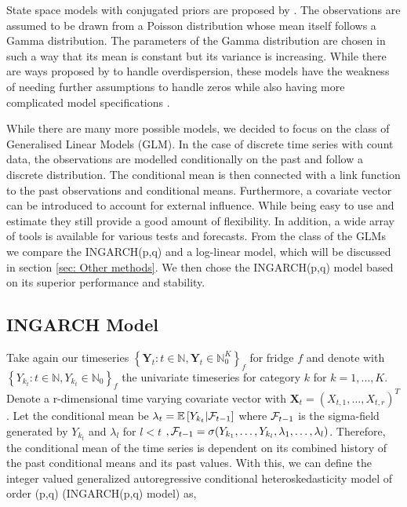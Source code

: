 State space models with conjugated priors are proposed by \cite{Harvey:1989}. The observations are assumed to be drawn from a Poisson distribution whose mean itself follows a Gamma distribution. The parameters of the Gamma distribution are chosen in such a way that its mean is constant but its variance is increasing. While there are ways proposed by \cite{Qaqish:1988} to handle overdispersion, these models have the weakness of needing further assumptions to handle zeros while also having more complicated model specifications \cite{Heinen:2003}.

While there are many more possible models, we decided to focus on the class of Generalised Linear Models (GLM). In the case of discrete time series with count data, the observations are modelled conditionally on the past and follow a discrete distribution. The conditional mean is then connected with a link function to the past observations and conditional means. Furthermore, a covariate vector can be introduced to account for external influence. While being easy to use and estimate they still provide a good amount of flexibility. In addition, a wide array of tools is available for various tests and forecasts. From the class of the GLMs we compare the INGARCH(p,q) and a log-linear model, which will be discussed in section \ref{sec: Other methods}. We then chose the INGARCH(p,q) model based on its superior performance and stability.


\subsection{INGARCH Model}
\label{sec:Ingarch Model}
Take again our timeseries $\left\{\bm{Y}_t:t\in \mathbb{N}, \bm{Y}_t \in \mathbb{N}_0^K \right\}_f$ for fridge $f$ and denote with $\left\{Y_{k_t}:t\in \mathbb{N}, Y_{k_t} \in \mathbb{N}_0\right\}_f$ the univariate timeseries for category $k$ for $k=1,\ldots,K$. Denote a r-dimensional time varying covariate vector with $\textbf{X}_t=(X_{t,1},\ldots,X_{t,r})^T$. Let the conditional mean be $\lambda_t = \mathbb{E}\left[Y_{k_t} | \mathcal{F}_{t-1} \right]$ where $\mathcal{F}_{t-1}$ is the sigma-field generated by $Y_{k_t}$ and $\lambda_l$ for $l<t$ $, \mathcal{F} _{t-1}= \sigma(Y_{k_1},\ldots,Y_{k_l},\lambda_1, \ldots, \lambda_l)$. Therefore, the conditional mean of the time series is dependent on its combined history of the past conditional means and its past values. With this, we can define the integer valued generalized autoregressive conditional heteroskedasticity model of order (p,q) (INGARCH(p,q) model) as,

